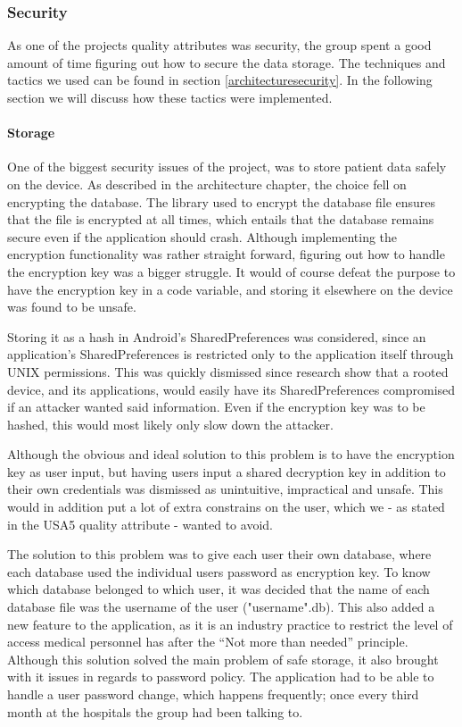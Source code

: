 \subsubsection{Security}
As one of the projects quality attributes was security, the group spent a good amount of time figuring out how to secure the data storage. The techniques and tactics we used can be found in section \ref{architecturesecurity}. In the following section we will discuss how these tactics were implemented.

\paragraph*{Storage}
One of the biggest security issues of the project, was to store patient data safely on the device. As described in the architecture chapter, the choice fell on encrypting the database. The library used to encrypt the database file ensures that the file is encrypted at all times, which entails that the database remains secure even if the application should crash. Although implementing the encryption functionality was rather straight forward, figuring out how to handle the encryption key was a bigger struggle. It would of course defeat the purpose to have the encryption key in a code variable, and storing it elsewhere on the device was found to be unsafe. 

Storing it as a hash in Android's SharedPreferences was considered, since an application's SharedPreferences is restricted only to the application itself through UNIX permissions. This was quickly dismissed since research show that a rooted device, and its applications, would easily have its SharedPreferences compromised if an attacker wanted said information. Even if the encryption key was to be hashed, this would most likely only slow down the attacker. 

\noindent
Although the obvious and ideal solution to this problem is to have the encryption key as user input, but having users input a shared decryption key in addition to their own credentials was dismissed as unintuitive, impractical and unsafe. This would in addition put a lot of extra constrains on the user, which we - as stated in the USA5 quality attribute - wanted to avoid. 

The solution to this problem was to give each user their own database, where each database used the individual users password as encryption key. To know which database belonged to which user, it was decided that the name of each database file was the username of the user ("username".db). This also added a new feature to the application, as it is an industry practice to restrict the level of access medical personnel has after the “Not more than needed”  principle. Although this solution solved the main problem of safe storage, it also brought with it issues in regards to password policy. The application had to be able to handle a user password change, which happens frequently; once every third month at the hospitals the group had been talking to.

